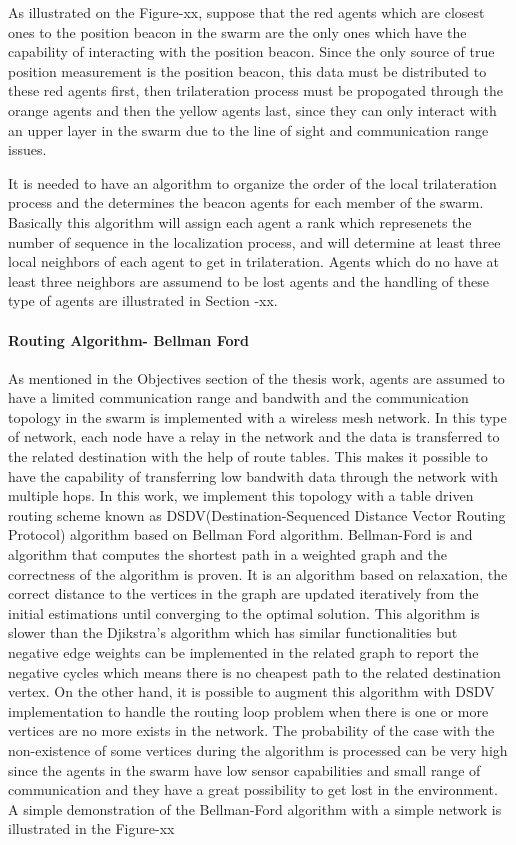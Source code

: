 \documentclass[twoside]{article}
\begin{document}
	As illustrated on the Figure-xx, suppose that the red agents which are closest ones to the position beacon in the swarm are the only ones which have the capability of interacting with the position beacon. Since the only source of true position measurement is the position beacon, this data must be distributed to these red agents first, then trilateration process must be propogated through the orange agents and then the yellow agents last, since they can only interact with an upper layer in the swarm due to the line of sight and communication range issues.
	
	It is needed to have an algorithm to organize the order of the local trilateration process and the determines the beacon agents for each member of the swarm. Basically this algorithm will assign each agent a rank which represenets the number of sequence in the localization process, and will determine at least three local neighbors of each agent to get in trilateration. Agents which do no have at least three neighbors are assumend to be lost agents and the handling of these type of agents are illustrated in Section -xx.
	
	\paragraph{Routing Algorithm- Bellman Ford}
	As mentioned in the Objectives section of the thesis work, agents are assumed to have a limited communication range and bandwith and the communication topology in the swarm is implemented with a wireless mesh network. In this type of network, each node have a relay in the network and the data is transferred to the related destination with the help of route tables. This makes it possible to have the capability of transferring low bandwith data through the network with multiple hops.  In this work, we implement this topology with a table driven routing scheme known as DSDV(Destination-Sequenced Distance Vector Routing Protocol) algorithm based on Bellman Ford algorithm. Bellman-Ford is and algorithm that computes the shortest path in a weighted graph and the correctness of the algorithm is proven. It is an algorithm based on relaxation, the correct distance to the vertices in the graph are updated iteratively from the initial estimations until converging to the optimal solution. This algorithm is slower than the Djikstra's algorithm which has similar functionalities but negative edge weights can be implemented in the related graph to report the negative cycles which means there is no cheapest path to the related destination vertex. On the other hand, it is possible to augment this algorithm with DSDV implementation to handle the routing loop problem when there is one or more vertices are no more exists in the network. The probability of the case with the non-existence of some vertices during the algorithm is processed can be very high since the agents in the swarm have low sensor capabilities and small range of communication and they have a great possibility to get lost in the environment. A simple demonstration of the Bellman-Ford algorithm with a simple network is illustrated in the Figure-xx
	
\end{document}
